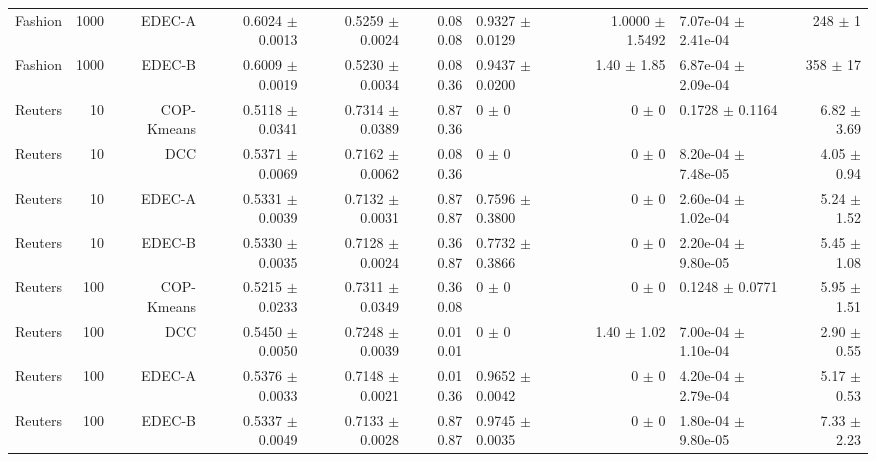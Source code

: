 \begin{table}[ht]
{\begin{tabular}{ | r | r | r | r | r | r | H  r | H  r |}
Fashion & 1000 & EDEC-A & { \color{green} 0.6024 $\pm$ 0.0013} & { \color{green} 0.5259 $\pm$ 0.0024} & { \color{green} 0.08} { \color{green} 0.08} & 0.9327 $\pm$ 0.0129 & 1.0000 $\pm$ 1.5492 & 7.07e-04 $\pm$ 2.41e-04 & 248 $\pm$ 1 \\ 
Fashion & 1000 & EDEC-B & { \color{blue} 0.6009 $\pm$ 0.0019} & { \color{blue} 0.5230 $\pm$ 0.0034} & { \color{green} 0.08} { \color{green} 0.36} & 0.9437 $\pm$ 0.0200 & 1.40 $\pm$ 1.85 & 6.87e-04 $\pm$ 2.09e-04 & 358 $\pm$ 17 \\ \hline 
Reuters & 10 & COP-Kmeans & { \color{blue} 0.5118 $\pm$ 0.0341} & { \color{green} 0.7314 $\pm$ 0.0389} & { \color{black}0.87} { \color{green} 0.36} & 0 $\pm$ 0 & 0 $\pm$ 0 & 0.1728 $\pm$ 0.1164 & 6.82 $\pm$ 3.69 \\ 
Reuters & 10 & DCC & { \color{green} 0.5371 $\pm$ 0.0069} & { \color{blue} 0.7162 $\pm$ 0.0062} & { \color{green} 0.08} { \color{green} 0.36} & 0 $\pm$ 0 & 0 $\pm$ 0 & 8.20e-04 $\pm$ 7.48e-05 & 4.05 $\pm$ 0.94 \\ 
Reuters & 10 & EDEC-A & { \color{blue} 0.5331 $\pm$ 0.0039} & { \color{blue} 0.7132 $\pm$ 0.0031} & { \color{green} 0.87} { \color{green} 0.87} & 0.7596 $\pm$ 0.3800 & 0 $\pm$ 0 & 2.60e-04 $\pm$ 1.02e-04 & 5.24 $\pm$ 1.52 \\ 
Reuters & 10 & EDEC-B & { \color{blue} 0.5330 $\pm$ 0.0035} & { \color{blue} 0.7128 $\pm$ 0.0024} & { \color{green} 0.36} { \color{green} 0.87} & 0.7732 $\pm$ 0.3866 & 0 $\pm$ 0 & 2.20e-04 $\pm$ 9.80e-05 & 5.45 $\pm$ 1.08 \\ \hline 
Reuters & 100 & COP-Kmeans & { \color{blue} 0.5215 $\pm$ 0.0233} & { \color{green} 0.7311 $\pm$ 0.0349} & { \color{black}0.36} { \color{green} 0.08} & 0 $\pm$ 0 & 0 $\pm$ 0 & 0.1248 $\pm$ 0.0771 & 5.95 $\pm$ 1.51 \\ 
Reuters & 100 & DCC & { \color{green} 0.5450 $\pm$ 0.0050} & { \color{blue} 0.7248 $\pm$ 0.0039} & { \color{green} 0.01} { \color{green} 0.01} & 0 $\pm$ 0 & 1.40 $\pm$ 1.02 & 7.00e-04 $\pm$ 1.10e-04 & 2.90 $\pm$ 0.55 \\ 
Reuters & 100 & EDEC-A & { \color{blue} 0.5376 $\pm$ 0.0033} & { \color{blue} 0.7148 $\pm$ 0.0021} & { \color{green} 0.01} { \color{green} 0.36} & 0.9652 $\pm$ 0.0042 & 0 $\pm$ 0 & 4.20e-04 $\pm$ 2.79e-04 & 5.17 $\pm$ 0.53 \\ 
Reuters & 100 & EDEC-B & { \color{blue} 0.5337 $\pm$ 0.0049} & { \color{blue} 0.7133 $\pm$ 0.0028} & { \color{green} 0.87} { \color{green} 0.87} & 0.9745 $\pm$ 0.0035 & 0 $\pm$ 0 & 1.80e-04 $\pm$ 9.80e-05 & 7.33 $\pm$ 2.23 \\ \hline 

\end{tabular}}
\end{table}
